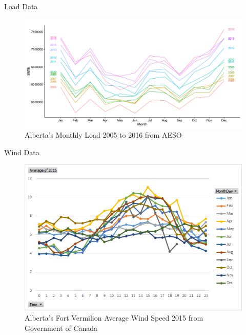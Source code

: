 \documentclass[newPxFont,numfooter,progressbar,sectionpages]{beamer}
\begin{document}
\begin{frame}[c]{Load Data}

\begin{figure}
\centering
\includegraphics[width=0.9\linewidth]{"figure/monthLoad"}
\caption{Alberta’s Monthly Load 2005 to 2016 from AESO}
\label{fig:monthLoad}
\end{figure}



\end{frame}




\begin{frame}[c]{Wind Data}

\begin{figure}
\centering
\includegraphics[width=0.9\linewidth]{"figure/fortVermilion"}
\caption{Alberta’s Fort Vermilion Average Wind Speed 2015 from Government of Canada}
\label{fig:wind}
\end{figure}



\end{frame}
\end{document}
